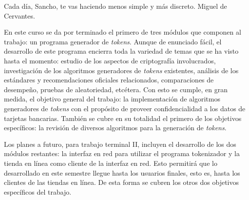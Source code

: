 %
%

\label{sec:conclusiones}
{%
  Cada día, Sancho, te vas haciendo menos simple y más discreto.%
}
{%
   Miguel de Cervantes.%
}

\noindent
En este curso se da por terminado el primero de tres módulos que componen al
trabajo: un programa generador de \textit{tokens}. Aunque de enunciado fácil,
el desarrollo de este programa encierra toda la variedad de temas que se ha
visto hasta el momento: estudio de los aspectos de criptografía involucrados,
investigación de los algoritmos generadores de \textit{tokens} existentes,
análisis de los estándares y recomendaciones oficiales relacionados,
comparaciones de desempeño, pruebas de aleatoriedad, etcétera. Con esto se
cumple, en gran medida, el objetivo general del trabajo: la implementación de
algoritmos generadores de \textit{tokens} con el propósito de proveer
confidencialidad a los datos de tarjetas bancarias. También se cubre en su
totalidad el primero de los objetivos específicos: la revisión de diversos
algoritmos para la generación de \textit{tokens}.

Los planes a futuro, para trabajo terminal II, incluyen el desarrollo de los
dos módulos restantes: la interfaz en red para utilizar el programa tokenizador
y la tienda en línea como cliente de la interfaz en red. Esto permitirá que lo
desarrollado en este semestre llegue hasta los usuarios finales, esto es, hasta
los clientes de las tiendas en línea. De esta forma se cubren los otros dos
objetivos específicos del trabajo.
